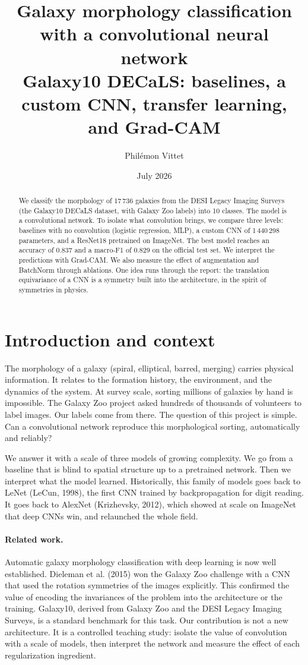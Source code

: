 \documentclass[11pt,a4paper]{article}
\title{Galaxy morphology classification with a convolutional neural network\\
\large Galaxy10 DECaLS: baselines, a custom CNN, transfer learning, and Grad-CAM}
\author{Philémon Vittet}
\date{July 2026}
\newcommand{\accResnet}{0.837}
\newcommand{\fResnet}{0.829}
\newcommand{\cnnparams}{1\,440\,298}
\begin{document}
\maketitle

\begin{abstract}
\noindent
We classify the morphology of 17\,736 galaxies from the DESI Legacy Imaging Surveys
(the Galaxy10 DECaLS dataset, with Galaxy Zoo labels) into 10 classes. The model is a
convolutional network. To isolate what convolution brings, we compare three levels:
baselines with no convolution (logistic regression, MLP), a custom CNN of \cnnparams{}
parameters, and a ResNet18 pretrained on ImageNet. The best model reaches an accuracy of
\accResnet{} and a macro-F1 of \fResnet{} on the official test set. We interpret the
predictions with Grad-CAM. We also measure the effect of augmentation and BatchNorm through
ablations. One idea runs through the report: the translation equivariance of a CNN is a
symmetry built into the architecture, in the spirit of symmetries in physics.
\end{abstract}

\section{Introduction and context}

The morphology of a galaxy (spiral, elliptical, barred, merging) carries physical
information. It relates to the formation history, the environment, and the dynamics of the
system. At survey scale, sorting millions of galaxies by hand is impossible. The Galaxy Zoo
project asked hundreds of thousands of volunteers to label images. Our labels come from
there. The question of this project is simple. Can a convolutional network reproduce this
morphological sorting, automatically and reliably?

We answer it with a scale of three models of growing complexity. We go from a baseline that
is blind to spatial structure up to a pretrained network. Then we interpret what the model
learned. Historically, this family of models goes back to LeNet (LeCun, 1998), the first CNN
trained by backpropagation for digit reading. It goes back to AlexNet (Krizhevsky, 2012),
which showed at scale on ImageNet that deep CNNs win, and relaunched the whole field.

\paragraph{Related work.} Automatic galaxy morphology classification with deep learning is
now well established. Dieleman et al. (2015) won the Galaxy Zoo challenge with a CNN that
used the rotation symmetries of the images explicitly. This confirmed the value of encoding
the invariances of the problem into the architecture or the training. Galaxy10, derived from
Galaxy Zoo and the DESI Legacy Imaging Surveys, is a standard benchmark for this task. Our
contribution is not a new architecture. It is a controlled teaching study: isolate the value
of convolution with a scale of models, then interpret the network and measure the effect of
each regularization ingredient.
\end{document}
